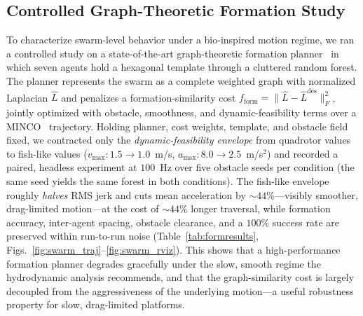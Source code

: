 \documentclass[journal]{IEEEtran}
\begin{document}
\subsection{Controlled Graph-Theoretic Formation Study}
To characterize swarm-level behavior under a bio-inspired motion regime, we ran a
controlled study on a state-of-the-art graph-theoretic formation
planner~\cite{quan2022distributed} in which seven agents hold a hexagonal template
through a cluttered random forest. The planner represents the swarm as a complete
weighted graph with normalized Laplacian $\hat{L}$ and penalizes a
formation-similarity cost
$f_{\mathrm{form}}=\lVert \hat{L}-\hat{L}^{\mathrm{des}}\rVert_F^2$, jointly
optimized with obstacle, smoothness, and dynamic-feasibility terms over a
MINCO~\cite{wang2022geometrically} trajectory. Holding planner, cost weights,
template, and obstacle field fixed, we contracted only the
\emph{dynamic-feasibility envelope} from quadrotor values to fish-like values
($v_{\max}\!:\!1.5\!\rightarrow\!1.0$~m/s,
$a_{\max}\!:\!8.0\!\rightarrow\!2.5$~m/s$^2$) and recorded a paired, headless
experiment at $100$~Hz over five obstacle seeds per condition (the same seed yields
the same forest in both conditions). The fish-like envelope roughly \emph{halves}
RMS jerk and cuts mean acceleration by $\sim\!44\%$---visibly smoother,
drag-limited motion---at the cost of $\sim\!44\%$ longer traversal, while formation
accuracy, inter-agent spacing, obstacle clearance, and a $100\%$ success rate are
preserved within run-to-run noise (Table~\ref{tab:formresults},
Figs.~\ref{fig:swarm_traj}--\ref{fig:swarm_rviz}). This shows that a
high-performance formation planner degrades gracefully under the slow, smooth
regime the hydrodynamic analysis recommends, and that the graph-similarity cost is
largely decoupled from the aggressiveness of the underlying motion---a useful
robustness property for slow, drag-limited platforms.
\end{document}
